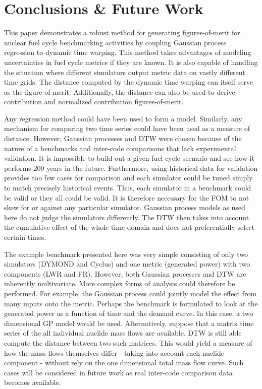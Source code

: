\section{Conclusions \& Future Work}
\label{conclusion}

This paper demonstrates a robust method for generating figures-of-merit
for nuclear fuel cycle benchmarking activities by coupling Gaussian process
regression to dynamic time warping. This method takes advantages of modeling
uncertainties in fuel cycle metrics if they are known. It is also capable 
of handling the situation where different simulators output metric data on
vastly different time grids. The distance computed by the dynamic time 
warping can itself serve as the figure-of-merit. Additionally, the 
distance can also be used to derive contribution and normalized contribution
figures-of-merit.

Any regression method could have been used to form a model. Similarly, any
mechanism for comparing two time series could have been used as a measure
of distance.  However, Gaussian processes and DTW were chosen because of 
the nature of a benchmarks and inter-code comparisons that lack experimental
validation. It is impossible to build out a given fuel cycle scenario
and see how it performs 200 years in the future. Furthermore, using 
historical data for validation provides too few cases for comparison and 
each simulator could be tuned simply to match precisely historical events.
Thus, each simulator in a benchmark could be valid or they all could be 
valid. It is therefore necessary for the FOM to not skew for or against 
any particular simulator. Gaussian process models as used here do not 
judge the simulators differently. The DTW then takes into account the 
cumulative effect of the whole time domain and does not preferentially 
select certain times.

The example benchmark presented here was very simple consisting of only
two simulators (DYMOND and Cyclus) and one metric (generated power) with
two components (LWR and FR).  However, both Gaussian processes and DTW
are inherently multivariate. More complex forms of analysis could therefore
be performed. For example, the Gaussian process could jointly model the 
effect from many inputs onto the metric. Perhaps the benchmark is formulated
to look at the generated power as a function of time and the demand curve.
In this case, a two dimensional GP model would be used. Alternatively, 
suppose that a matrix time series of the all individual nuclide mass flows 
are available. DTW is still able compute the distance between two 
such matrices. This would yield a measure of how the mass flows themselves
differ - taking into account each nuclide component - without rely on the
one dimensional total mass flow curve.  Such cases will be considered in
future work as real inter-code comparison data becomes available.

